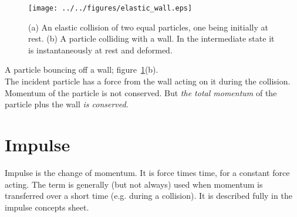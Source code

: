 \begin{figure}[h!]
\centering
\texttt{[image: ../../figures/elastic\_wall.eps]}
\caption{(a) An elastic collision of two equal particles, one being initially at rest. (b) A particle colliding with a wall.  In the intermediate state it is instantaneously at rest and deformed.}\label{fig:elastic_wall}
\end{figure}
A particle bouncing off a wall; figure~\ref{fig:elastic_wall}(b).\\
The incident particle has a force from the wall acting on it during the collision.  Momentum of the particle is not conserved. But \emph{the total momentum} of the particle plus the wall \emph{is conserved}.


\section{Impulse}
Impulse is the change of momentum.  It is force times time, for a constant force acting.  The term is generally (but not always) used when momentum is transferred over a short time (e.g. during a collision).  It is described fully in the impulse concepts sheet.


